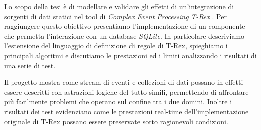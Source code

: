Lo scopo della tesi è di modellare e validare gli effetti di un'in\-te\-gra\-zio\-ne di sorgenti di dati statici nel tool di \emph{Complex Event Processing} \emph{T-Rex} \cite{trex}. Per raggiungere questo obiettivo presentiamo l'im\-ple\-men\-ta\-zio\-ne di un componente che permetta l'in\-te\-ra\-zio\-ne con un database \emph{SQLite}. In particolare descriviamo l'es\-ten\-sio\-ne del linguaggio di definizione di regole di T-Rex, spieghiamo i principali algoritmi e discutiamo le pre\-sta\-zio\-ni ed i limiti analizzando i risultati di una serie di test.

Il progetto mostra come stream di eventi e collezioni di dati possano in effetti essere descritti con astrazioni logiche del tutto simili, permettendo di affrontare più facilmente problemi che operano sul confine tra i due domini. Inoltre i risultati dei test evidenziano come le prestazioni real-time dell'implementazione originale di T-Rex possano essere preservate sotto ragionevoli condizioni.
